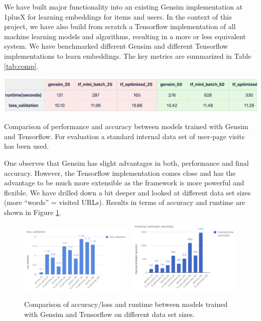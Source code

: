 \documentclass{article}
\begin{document}
We have built major functionality into an existing Gensim implementation at 1plusX for learning embeddings for items and users. In the context of this project, we have also build from scratch a Tensorflow implementation of all machine learning models and algorithms, resulting in a more or less equivalent system. We have benchmarked different Gensim and different Tensorflow implementations to learn embeddings. The key metrics are summarized in Table \ref{tab:comp}.
\begin{table}
\begin{center}
\includegraphics[width=\textwidth]{comp}
\end{center}
\caption{Comparison of performance and accuracy between models trained with Gensim and Tensorflow. For evaluation a standard internal data set of user-page visits has been used.}
\label{tab:comp}
\end{table}
One observes that Gensim has slight advantages in both, performance and final accuracy. However, the Tensorflow implementation comes close and has the advantage to be much more extensible as the framework is more powerful and flexible. We have drilled down a bit deeper and looked at different data set sizes (more ``words'' = visited URLs). Results in terms of accuracy and runtime are shown in Figure \ref{fig:comp}. \begin{figure}
\begin{center}
\includegraphics[width=0.48\textwidth]{loss_val}
\
\includegraphics[width=0.48\textwidth]{run_val}
\end{center}
\caption{Comparison of accuracy/loss and runtime between models trained with Gensim and Tensorflow on different data set sizes.}
\label{fig:comp}
\end{figure}
\end{document}
